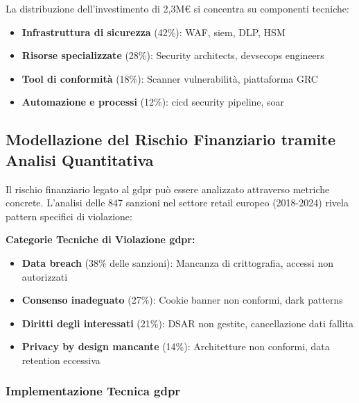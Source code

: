 La distribuzione dell'investimento di 2,3M€ si concentra su componenti tecniche:
\begin{itemize}
    \item \textbf{Infrastruttura di sicurezza} (42\%): WAF, \gls{siem}, DLP, HSM
    \item \textbf{Risorse specializzate} (28\%): Security architects, \gls{devsecops} engineers
    \item \textbf{Tool di conformità} (18\%): Scanner vulnerabilità, piattaforma GRC
    \item \textbf{Automazione e processi} (12\%): \gls{cicd} security pipeline, \gls{soar}
\end{itemize}

\subsection{\texorpdfstring{Modellazione del Rischio Finanziario tramite Analisi Quantitativa}{4.2.2 - Modellazione del Rischio Finanziario tramite Analisi Quantitativa}}

Il rischio finanziario legato al \gls{gdpr} può essere analizzato attraverso metriche concrete\autocite{mcneil2015}. L'analisi delle 847 sanzioni nel settore retail europeo (2018-2024)\autocite{EDPB2024} rivela pattern specifici di violazione:

\textbf{Categorie Tecniche di Violazione \gls{gdpr}:}
\begin{itemize}
    \item \textbf{Data breach} (38\% delle sanzioni): Mancanza di crittografia, accessi non autorizzati
    \item \textbf{Consenso inadeguato} (27\%): Cookie banner non conformi, dark patterns
    \item \textbf{Diritti degli interessati} (21\%): DSAR non gestite, cancellazione dati fallita
    \item \textbf{Privacy by design mancante} (14\%): Architetture non conformi, data retention eccessiva
\end{itemize}

\subsubsection{\texorpdfstring{Implementazione Tecnica \gls{gdpr}}{4.2.2.1 - Implementazione Tecnica GDPR}}

